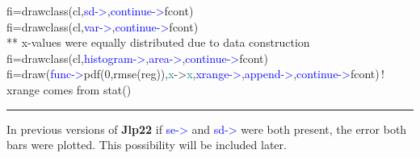\begin{example}[drawclassex]
fi=\textcolor{VioletRed}{drawclass}(cl,\textcolor{blue}{sd->},\textcolor{blue}{continue->}fcont)\\ 
fi=\textcolor{VioletRed}{drawclass}(cl,\textcolor{blue}{var->},\textcolor{blue}{continue->}fcont)\\ 
{\color{ForestGreen}** x-values were equally distributed due to data construction}\\ 
fi=\textcolor{VioletRed}{drawclass}(cl,\textcolor{blue}{histogram->},\textcolor{blue}{area->},\textcolor{blue}{continue->}fcont)\\ 
fi=\textcolor{VioletRed}{draw}(\textcolor{blue}{func->}\textcolor{VioletRed}{pdf}(0,\textcolor{VioletRed}{rmse}(reg)),\textcolor{teal}{x}->\textcolor{teal}{x},\textcolor{blue}{xrange->},\textcolor{blue}{append->},\textcolor{blue}{continue->}fcont)\,{\color{ForestGreen}! xrange comes from stat()}\\ 
\end{example} 
\vspace{-7mm} \rule{5cm}{0.1pt} 
\onehalfspacing 
\begin{note} 
In previous versions of \textbf{Jlp22} if \textcolor{blue}{se->} and \textcolor{blue}{sd->} were both present, the error 
both bars were plotted. This possibility will be included later. 
\end{note} 
